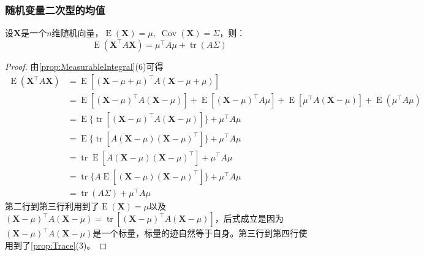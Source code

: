 \subsubsection{随机变量二次型的均值}
\begin{theorem}\label{theo:ERVQuadraticForm}
	设$\mathbf{X}$是一个$n$维随机向量，$\operatorname{E}(\mathbf{X})=\mu,\;\operatorname{Cov}(\mathbf{X})=\Sigma$，则：
	\begin{equation*}
		\operatorname{E}(\mathbf{X}^{\top}A\mathbf{X})=\mu^{\top}A\mu+\operatorname{tr}(A\Sigma)
	\end{equation*}	
\end{theorem}
\begin{proof}
	由\cref{prop:MeasurableIntegral}(6)可得
	\begin{align*}
		\operatorname{E}(\mathbf{X}^{\top}A\mathbf{X})
		&=\operatorname{E}[(\mathbf{X}-\mu+\mu)^{\top}A(\mathbf{X}-\mu+\mu)] \\
		&=\operatorname{E}[(\mathbf{X}-\mu)^{\top}A(\mathbf{X}-\mu)]+\operatorname{E}[(\mathbf{X}-\mu)^{\top}A\mu]+\operatorname{E}[\mu^{\top}A(\mathbf{X}-\mu)]+\operatorname{E}(\mu^{\top}A\mu) \\
		&=\operatorname{E}\{\operatorname{tr}[(\mathbf{X}-\mu)^{\top}A(\mathbf{X}-\mu)]\}+\mu^{\top}A\mu \\
		&=\operatorname{E}\{\operatorname{tr}[A(\mathbf{X}-\mu)(\mathbf{X}-\mu)^{\top}]\}+\mu^{\top}A\mu \\
		&=\operatorname{tr}\operatorname{E}[A(\mathbf{X}-\mu)(\mathbf{X}-\mu)^{\top}]+\mu^{\top}A\mu \\
		&=\operatorname{tr}\{A\operatorname{E}[(\mathbf{X}-\mu)(\mathbf{X}-\mu)^{\top}]\}+\mu^{\top}A\mu \\
		&=\operatorname{tr}(A\Sigma)+\mu^{\top}A\mu
	\end{align*}
	第二行到第三行利用到了$\operatorname{E}(\mathbf{X})=\mu$以及$(\mathbf{X}-\mu)^{\top}A(\mathbf{X}-\mu)=\operatorname{tr}[(\mathbf{X}-\mu)^{\top}A(\mathbf{X}-\mu)]$，后式成立是因为$(\mathbf{X}-\mu)^{\top}A(\mathbf{X}-\mu)$是一个标量，标量的迹自然等于自身。第三行到第四行使用到了\cref{prop:Trace}(3)。
\end{proof}
